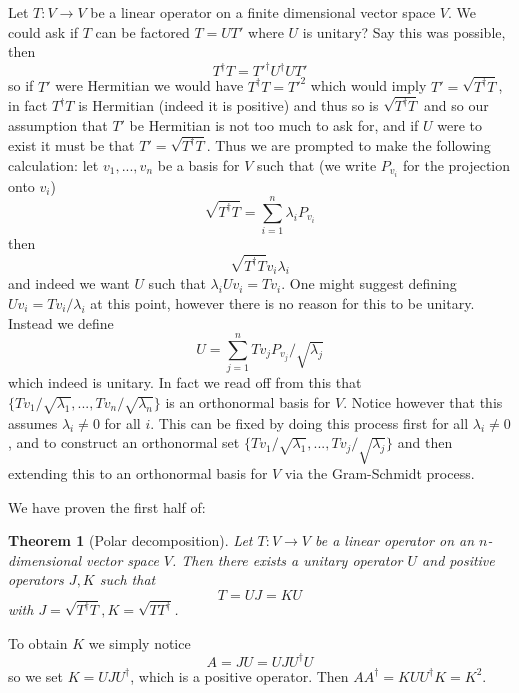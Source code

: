 \documentclass[12pt]{article}
\theoremstyle{plain}
\newtheorem{thm}{Theorem}[subsection] %
\theoremstyle{definition}
\newcommand{\lto}{\longrightarrow}
\begin{document}
\begin{observation}
	Let $T: V \lto V$ be a linear operator on a finite dimensional vector space $V$. We could ask if $T$ can be factored $T = UT'$ where $U$ is unitary? Say this was possible, then
	\begin{equation}
		T^\dagger T = T'^\dagger U^\dagger U T'
	\end{equation}
	so if $T'$ were Hermitian we would have $T^\dagger T = T'^2$ which would imply $T' = \sqrt{T^\dagger T}$, in fact $T^\dagger T$ is Hermitian (indeed it is positive) and thus so is $\sqrt{T^\dagger T}$ and so our assumption that $T'$ be Hermitian is not too much to ask for, and if $U$ were to exist it must be that $T' = \sqrt{T^\dagger T}$. Thus we are prompted to make the following calculation: let $v_1,...,v_n$ be a basis for $V$ such that (we write $P_{v_i}$ for the projection onto $v_i$)
	\begin{equation}
		\sqrt{T^\dagger T} = \sum_{i = 1}^n \lambda_i P_{v_i}
	\end{equation}
	then
	\begin{equation}
		\sqrt{T^\dagger T}v_i \lambda_i
	\end{equation}
	and indeed we want $U$ such that $\lambda_i Uv_i = Tv_i$. One might suggest defining $Uv_i = Tv_i/\lambda_i$ at this point, however there is no reason for this to be unitary. Instead we define
	\begin{equation}
		U = \sum_{j = 1}^n Tv_jP_{v_j}/\sqrt{\lambda_j}
	\end{equation}
	which indeed is unitary.  In fact we read off from this that $\lbrace Tv_1/\sqrt{\lambda_1},...,Tv_n/\sqrt{\lambda_n}\rbrace$ is an orthonormal basis for $V$. Notice however that this assumes $\lambda_i \neq 0$ for all $i$. This can be fixed by doing this process first for all $\lambda_i \neq 0$, and to construct an orthonormal set $\lbrace Tv_1/\sqrt{\lambda_1},...,Tv_j/\sqrt{\lambda_j}\rbrace$ and then extending this to an orthonormal basis for $V$ via the Gram-Schmidt process.
	
	We have proven the first half of:
	\begin{thm}[Polar decomposition]\label{thm:polar_decomp}
		Let $T: V \lto V$ be a linear operator on an $n$-dimensional vector space $V$. Then there exists a unitary operator $U$ and positive operators $J,K$ such that
		\begin{equation}
			T = UJ = KU
		\end{equation}
		with $J = \sqrt{T^\dagger T}, K = \sqrt{TT^\dagger}$.
	\end{thm}
	To obtain $K$ we simply notice
	\begin{equation}
		A = JU = UJU^\dagger  U
	\end{equation}
	so we set $K = UJU^\dagger$, which is a positive operator. Then $AA^\dagger = KUU^\dagger K = K^2$.
\end{observation}
\end{document}
